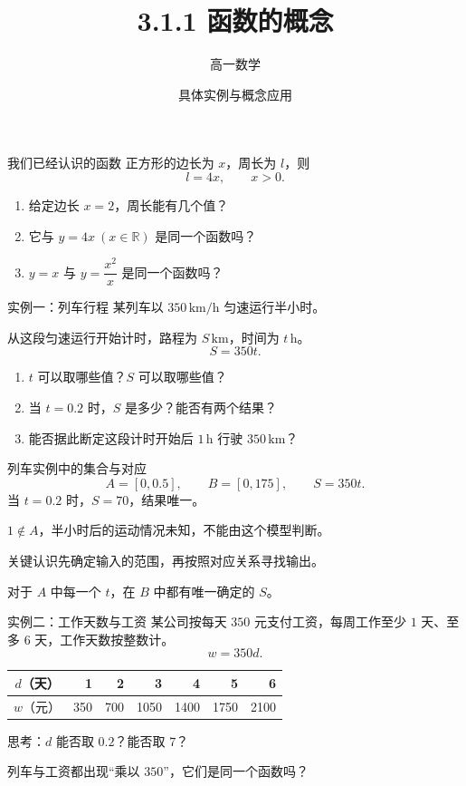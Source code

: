 \documentclass[aspectratio=169,10pt]{beamer}
\title{3.1.1 函数的概念}
\author{高一数学}
\date{具体实例与概念应用}
\newcommand{\R}{\mathbb R}
\newcommand{\src}[1]{}
\newcommand{\key}[1]{\begin{block}{关键认识}#1\end{block}}
\begin{document}
\campusmaketitle
\begin{frame}[t]{我们已经认识的函数}
正方形的边长为 $x$，周长为 $l$，则
\[l=4x,\qquad x>0.\]
\bigskip
\begin{enumerate}
\item 给定边长 $x=2$，周长能有几个值？
\item 它与 $y=4x\ (x\in\R)$ 是同一个函数吗？
\item $y=x$ 与 $y=\dfrac{x^2}{x}$ 是同一个函数吗？
\end{enumerate}
\src{教材第60页章引言改编。后两个问题留待本课结束回答。}
\end{frame}
\begin{frame}[t]{实例一：列车行程}
某列车以 $350\,\mathrm{km/h}$ 匀速运行半小时。\par
从这段匀速运行开始计时，路程为 $S\,\mathrm{km}$，时间为 $t\,\mathrm h$。
\[S=350t.\]
\begin{enumerate}
\item $t$ 可以取哪些值？$S$ 可以取哪些值？
\item 当 $t=0.2$ 时，$S$ 是多少？能否有两个结果？
\item 能否据此断定这段计时开始后 $1\,\mathrm h$ 行驶 $350\,\mathrm{km}$？
\end{enumerate}
\src{教材第60页问题1，措辞略作压缩。}
\end{frame}
\begin{frame}[t]{列车实例中的集合与对应}
\[A=[0,0.5],\qquad B=[0,175],\qquad S=350t.\]
\bigskip
当 $t=0.2$ 时，$S=70$，结果唯一。\par\medskip
$1\notin A$，半小时后的运动情况未知，不能由这个模型判断。
\key{先确定输入的范围，再按照对应关系寻找输出。\par
对于 $A$ 中每一个 $t$，在 $B$ 中都有唯一确定的 $S$。}
\src{教材第60页。区间包含起点和终点。}
\end{frame}
\begin{frame}[t]{实例二：工作天数与工资}
某公司按每天 $350$ 元支付工资，每周工作至少 $1$ 天、至多 $6$ 天，工作天数按整数计。
\[w=350d.\]
\begin{center}
\begin{tabular}{c|rrrrrr}
$d$（天）&1&2&3&4&5&6\\\hline
$w$（元）&350&700&1050&1400&1750&2100
\end{tabular}
\end{center}
\medskip
思考：$d$ 能否取 $0.2$？能否取 $7$？\par\medskip
列车与工资都出现“乘以 $350$”，它们是同一个函数吗？
\src{教材第61页问题2改编，明确按整数天数计。}
\end{frame}
\end{document}
